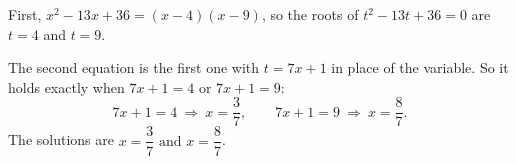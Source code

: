 First, $x^2-13x+36=(x-4)(x-9)$, so the roots of $t^2-13t+36=0$ are $t=4$ and $t=9$.

The second equation is the first one with $t=7x+1$ in place of the variable. So it holds exactly when $7x+1=4$ or $7x+1=9$:
\[
7x+1=4\ \Longrightarrow\ x=\dfrac{3}{7},\qquad 7x+1=9\ \Longrightarrow\ x=\dfrac{8}{7} .
\]
The solutions are $\boxed{x=\dfrac{3}{7}\text{ and }x=\dfrac{8}{7}}$.
